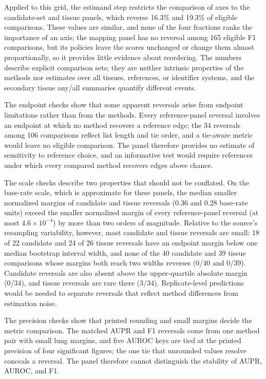 \documentclass[10pt,letterpaper]{article}
\begin{document}
Applied to this grid, the estimand step restricts the comparison of axes to the candidate-set and tissue panels, which reverse 16.3\% and 19.3\% of eligible comparisons. These values are similar, and none of the four fractions ranks the importance of an axis; the mapping panel has no reversal among 165 eligible F1 comparisons, but its policies leave the scores unchanged or change them almost proportionally, so it provides little evidence about reordering. The numbers describe explicit comparison sets; they are neither intrinsic properties of the methods nor estimates over all tissues, references, or identifier systems, and the secondary tissue any/all summaries quantify different events.

The endpoint checks show that some apparent reversals arise from endpoint limitations rather than from the methods. Every reference-panel reversal involves an endpoint at which no method recovers a reference edge; the 34 reversals among 106 comparisons reflect list length and tie order, and a tie-aware metric would leave no eligible comparison. The panel therefore provides no estimate of sensitivity to reference choice, and an informative test would require references under which every compared method recovers edges above chance.

The scale checks describe two properties that should not be conflated. On the base-rate scale, which is approximate for these panels, the median smaller normalized margins of candidate and tissue reversals (0.36 and 0.28 base-rate units) exceed the smaller normalized margin of every reference-panel reversal (at most $4.6\times10^{-4}$) by more than two orders of magnitude. Relative to the source's resampling variability, however, most candidate and tissue reversals are small: 18 of 22 candidate and 24 of 26 tissue reversals have an endpoint margin below one median bootstrap interval width, and none of the 40 candidate and 39 tissue comparisons whose margins both reach two widths reverses (0/40 and 0/39). Candidate reversals are also absent above the upper-quartile absolute margin (0/34), and tissue reversals are rare there (3/34). Replicate-level predictions would be needed to separate reversals that reflect method differences from estimation noise.

The precision checks show that printed rounding and small margins decide the metric comparison. The matched AUPR and F1 reversals come from one method pair with small lung margins, and five AUROC keys are tied at the printed precision of four significant figures; the one tie that unrounded values resolve conceals a reversal. The panel therefore cannot distinguish the stability of AUPR, AUROC, and F1.
\end{document}
